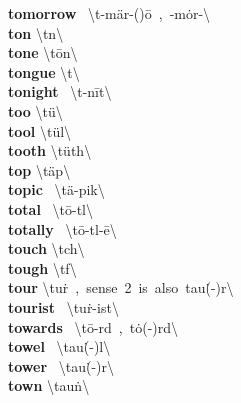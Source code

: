 \documentclass[10pt,a4paper]{article}
\begin{document}
\begin{multicols}{2}
\textbf{ tomorrow }\quad \ \textbackslash t\textschwa -\textprimstress m\"{a}r-(\textsecstress )\={o}\ ,\ -\textprimstress m\.{o}r-\textbackslash \\
\textbf{ ton }\quad \textbackslash \textprimstress t\textschwa n\textbackslash \\
\textbf{ tone }\quad \textbackslash \textprimstress t\={o}n\textbackslash \\
\textbf{ tongue }\quad \textbackslash \textprimstress t\textschwa \engma \textbackslash \\
\textbf{ tonight }\quad \ \textbackslash t\textschwa -\textprimstress n\={i}t\textbackslash \\
\textbf{ too }\quad \textbackslash \textprimstress t\"{u}\textbackslash \\
\textbf{ tool }\quad \textbackslash \textprimstress t\"{u}l\textbackslash \\
\textbf{ tooth }\quad \textbackslash \textprimstress t\"{u}th\textbackslash \\
\textbf{ top }\quad \textbackslash \textprimstress t\"{a}p\textbackslash \\
\textbf{ topic }\quad \ \textbackslash \textprimstress t\"{a}-pik\textbackslash \\
\textbf{ total }\quad \ \textbackslash \textprimstress t\={o}-t\textsuperscript{\textreve}l\textbackslash \\
\textbf{ totally }\quad \ \textbackslash \textprimstress t\={o}-t\textsuperscript{\textreve}l-\={e}\textbackslash \\
\textbf{ touch }\quad \textbackslash \textprimstress t\textschwa ch\textbackslash \\
\textbf{ tough }\quad \textbackslash \textprimstress t\textschwa f\textbackslash \\
\textbf{ tour }\quad \textbackslash \textprimstress tu\. r\ ,\ sense\ 2\ is\ also\ \textprimstress tau\. (-\textschwa )r\textbackslash \\
\textbf{ tourist }\quad \ \textbackslash \textprimstress tu\. r-ist\textbackslash \\
\textbf{ towards }\quad \ \textbackslash \textprimstress t\={o}-\textschwa rd\ ,\ \textprimstress t\.{o}(-\textschwa )rd\textbackslash \\
\textbf{ towel }\quad \ \textbackslash \textprimstress tau\. (-\textschwa )l\textbackslash \\
\textbf{ tower }\quad \ \textbackslash \textprimstress tau\. (-\textschwa )r\textbackslash \\
\textbf{ town }\quad \textbackslash \textprimstress tau\. n\textbackslash \\

\end{multicols}
\end{document}
